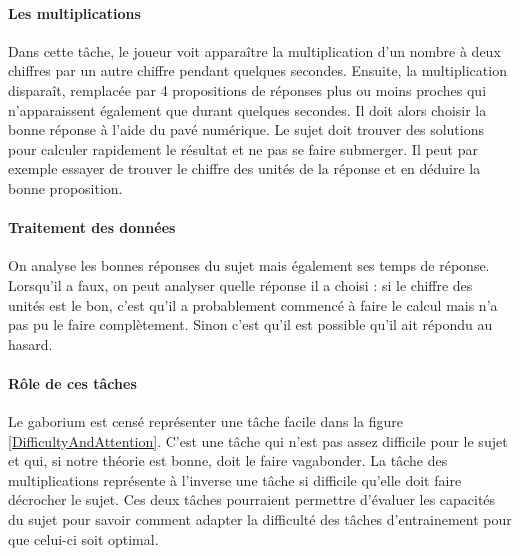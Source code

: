 \paragraph{Les multiplications}Dans cette tâche, le joueur voit apparaître la multiplication d'un nombre à deux chiffres par un autre chiffre pendant quelques secondes. Ensuite, la
multiplication disparaît, remplacée par 4 propositions de réponses plus ou moins proches qui n'apparaissent également que durant quelques secondes. Il doit alors choisir la bonne
réponse à l'aide du pavé numérique. Le sujet doit trouver des solutions pour calculer rapidement le résultat et ne pas se faire submerger. Il peut par exemple essayer de trouver le
chiffre des unités de la réponse et en déduire la bonne proposition.

\paragraph{Traitement des données}On analyse les bonnes réponses du sujet mais également ses temps de réponse. Lorsqu'il a faux, on peut analyser quelle réponse il a choisi : si le
chiffre des unités est le bon, c'est qu'il a probablement commencé à faire le calcul mais n'a pas pu le faire complètement. Sinon c'est qu'il est possible qu'il ait répondu au hasard.


\paragraph{Rôle de ces tâches}Le gaborium est censé représenter une tâche facile dans la figure \ref{DifficultyAndAttention}. C'est une tâche qui n'est pas assez difficile pour le
sujet et qui, si notre théorie est bonne, doit le faire vagabonder. La tâche des multiplications représente à l'inverse une tâche si difficile qu'elle doit faire décrocher le sujet.
Ces deux tâches pourraient permettre d'évaluer les capacités du sujet pour savoir comment adapter la difficulté des tâches d'entrainement pour que celui-ci soit optimal.
